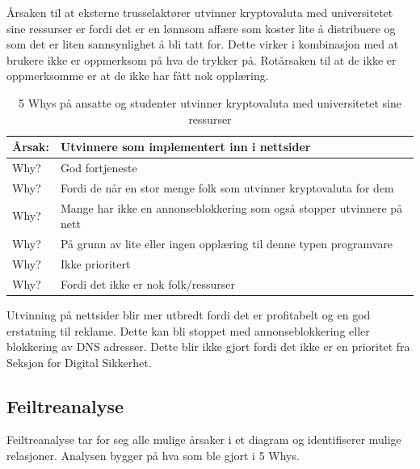 Årsaken til at eksterne trusselaktører utvinner kryptovaluta med universitetet sine ressurser er fordi det er en lønnsom affære som koster lite å distribuere og som det er liten sannsynlighet å bli tatt for. Dette virker i kombinasjon med at brukere ikke er oppmerksom på hva de trykker på. Rotårsaken til at de ikke er oppmerksomme er at de ikke har fått nok opplæring.

\begin{table} [H]
    \centering
    \begin{tabular}{ | m{5em} | m{30em} | }
        \hline
            \cellcolor{yellow} Årsak: & \cellcolor{yellow} Utvinnere som implementert inn i nettsider              \\
        \hline
            Why? & God fortjeneste                                   \\
        \hline
            Why? & Fordi de når en stor menge folk som utvinner kryptovaluta for dem                                           \\
        \hline
            Why? & Mange har ikke en annonseblokkering som også stopper utvinnere på nett               \\
        \hline
            Why? & På grunn av lite eller ingen opplæring til denne typen programvare           \\
        \hline
            Why? & Ikke prioritert    \\
        \hline
            Why? & Fordi det ikke er nok folk/ressurser    \\
        \hline
    \end{tabular}
    \caption[5 Whys: Utvinningsverktøy som er implementert inn i nettsider]{5 Whys på ansatte og studenter utvinner kryptovaluta med universitetet sine ressurser}
    \label{5Whys-minere}
\end{table}

Utvinning på nettsider blir mer utbredt fordi det er profitabelt og en god erstatning til reklame. Dette kan bli stoppet med annonseblokkering eller blokkering av DNS adresser. Dette blir ikke gjort fordi det ikke er en prioritet fra Seksjon for Digital Sikkerhet.

\subsection{Feiltreanalyse}
Feiltreanalyse tar for seg alle mulige årsaker i et diagram og identifiserer mulige relasjoner. Analysen bygger på hva som ble gjort i 5 Whys.

